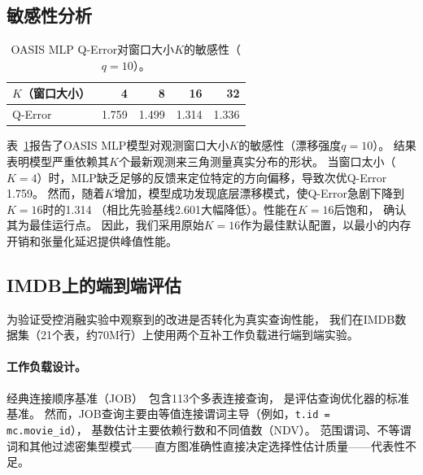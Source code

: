 \documentclass[runningheads]{llncs}
\begin{document}
\subsection{敏感性分析}
\label{sec:sensitivity}

\begin{table}[t]
  \centering
  \caption{OASIS MLP Q-Error对窗口大小$K$的敏感性（$q{=}10$）。}
  \label{tab:sensitivity}
  \begin{tabular}{l r r r r}
    \toprule
    $K$（窗口大小） & 4 & 8 & 16 & 32 \\
    \midrule
    Q-Error & 1.759 & 1.499 & 1.314 & 1.336 \\
    \bottomrule
  \end{tabular}
\end{table}

表~\ref{tab:sensitivity}报告了OASIS MLP模型对观测窗口大小$K$的敏感性（漂移强度$q{=}10$）。
结果表明模型严重依赖其$K$个最新观测来三角测量真实分布的形状。
当窗口太小（$K{=}4$）时，MLP缺乏足够的反馈来定位特定的方向偏移，导致次优Q-Error 1.759。
然而，随着$K$增加，模型成功发现底层漂移模式，使Q-Error急剧下降到$K{=}16$时的1.314
（相比先验基线2.601大幅降低）。性能在$K{=}16$后饱和，
确认其为最佳运行点。
因此，我们采用原始$K{=}16$作为最佳默认配置，以最小的内存开销和张量化延迟提供峰值性能。

\subsection{IMDB上的端到端评估}
\label{sec:job}

为验证受控消融实验中观察到的改进是否转化为真实查询性能，
我们在IMDB数据集（21个表，约70M行）上使用两个互补工作负载进行端到端实验。

\paragraph{工作负载设计。}
经典连接顺序基准（JOB）~\cite{leis2015good}包含113个多表连接查询，
是评估查询优化器的标准基准。
然而，JOB查询主要由等值连接谓词主导（例如，\texttt{t.id = mc.movie\_id}），
基数估计主要依赖行数和不同值数（NDV）。
范围谓词、不等谓词和其他过滤密集型模式——直方图准确性直接决定选择性估计质量——代表性不足。
\end{document}
